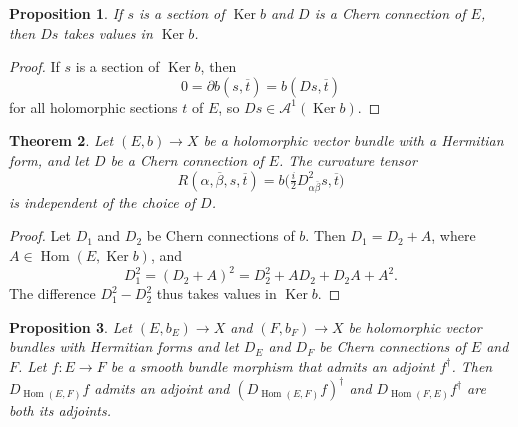 \documentclass[10pt,a4paper]{amsart}
\newtheorem{theo}{Theorem}[section]
\newtheorem{prop}[theo]{Proposition}
\theoremstyle{definition}
\newcommand{\cc}[1]{\mathcal{#1}}
\def\ov#1{\overline{#1}}
\DeclareMathOperator{\Ker}{Ker}
\DeclareMathOperator{\Hom}{Hom}
\begin{document}
\begin{prop}
If $s$ is a section of $\Ker b$ and $D$ is a Chern connection of $E$, then $Ds$ takes values in $\Ker b$.
\end{prop}

\begin{proof}
If $s$ is a section of $\Ker b$, then
\[
0
= \partial b(s, \ov t)
= b(Ds, \ov t)
\]
for all holomorphic sections $t$ of $E$, so $D s \in \cc A^1(\Ker b)$.
\end{proof}


\begin{theo}
Let $(E, b) \to X$ be a holomorphic vector bundle with a Hermitian form, and let $D$ be a Chern connection of $E$. The curvature tensor
\[
R(\alpha,\ov\beta,s, \ov t)
= b\bigl(\tfrac i2 D^2_{\alpha\ov\beta}s, \ov t\bigr)
\]
is independent of the choice of $D$.
\end{theo}

\begin{proof}
Let $D_1$ and $D_2$ be Chern connections of $b$. Then $D_1 = D_2 + A$, where $A \in \Hom(E, \Ker b)$, and
\[
D_1^2
= (D_2 + A)^2
= D_2^2 + A D_2 + D_2 A + A^2.
\]
The difference $D_1^2 - D_2^2$ thus takes values in $\Ker b$.
\end{proof}




\begin{prop}
Let $(E,b_E) \to X$ and $(F,b_F) \to X$ be holomorphic vector bundles with Hermitian forms and let $D_E$ and $D_F$ be Chern connections of $E$ and $F$. Let $f : E \to F$ be a smooth bundle morphism that admits an adjoint $f^\dagger$. Then $D_{\Hom(E,F)}f$ admits an adjoint and $(D_{\Hom(E,F)}f)^\dagger$ and $D_{\Hom(F,E)}f^\dagger$ are both its adjoints.
\end{prop}
\end{document}
